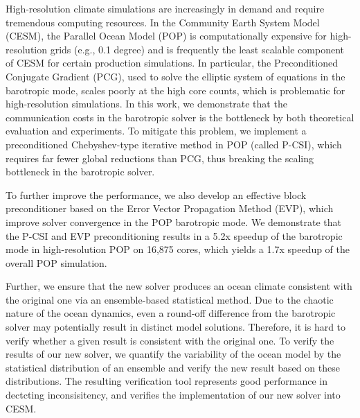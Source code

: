 \begin{eabstract}
  High-resolution climate simulations are increasingly in demand and
  require tremendous computing resources. 
  In the Community Earth System Model (CESM), the Parallel Ocean Model (POP) is
  computationally expensive for high-resolution grids (e.g., 0.1 degree) and is frequently the least scalable component of CESM for certain
  production simulations. 
  In particular, the Preconditioned Conjugate Gradient (PCG), used to solve the elliptic system of
  equations in the barotropic mode, scales poorly at the high core counts, which is problematic for high-resolution simulations. 
  In this work, we demonstrate that the communication costs in the
  barotropic solver is the bottleneck by both theoretical evaluation and experiments. 
  To mitigate this problem, we implement a preconditioned Chebyshev-type iterative
  method in POP (called P-CSI), which requires far fewer global
  reductions than PCG, thus breaking the scaling bottleneck in the barotropic solver. 


  To further improve the performance, we also develop an effective block preconditioner based on the Error Vector Propagation Method (EVP), which improve solver convergence in the POP barotropic mode.
  We demonstrate that the P-CSI and EVP preconditioning results in a 5.2x speedup of
  the barotropic mode in high-resolution POP on 16,875 cores, which
  yields a 1.7x speedup of the overall POP simulation.  

  Further, we ensure that the new solver produces an ocean climate consistent with the original one via an ensemble-based statistical method. 
  Due to the chaotic nature of the ocean dynamics, even a round-off difference from the barotropic solver may potentially result in distinct model solutions. Therefore, it is hard to verify whether a given result is consistent with the original one. 
  To verify the results of our new solver, we quantify the variability of the ocean model by the statistical distribution of an ensemble and verify the new result based on these distributions. 
  The resulting verification tool represents good performance in dectcting inconsisitency, and verifies the implementation of our new solver into CESM. 



\end{eabstract}

